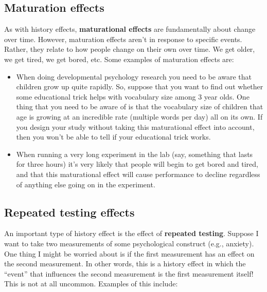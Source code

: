 \documentclass[
  a4paper,
]{book}
\providecommand{\tightlist}{%
  \setlength{\itemsep}{0pt}\setlength{\parskip}{0pt}}
\begin{document}
\subsection{Maturation effects}\label{maturation-effects}

As with history effects, \textbf{maturational effects} are fundamentally
about change over time. However, maturation effects aren't in response
to specific events. Rather, they relate to how people change on their
own over time. We get older, we get tired, we get bored, etc. Some
examples of maturation effects are:

\begin{itemize}
\tightlist
\item
  When doing developmental psychology research you need to be aware that
  children grow up quite rapidly. So, suppose that you want to find out
  whether some educational trick helps with vocabulary size among 3 year
  olds. One thing that you need to be aware of is that the vocabulary
  size of children that age is growing at an incredible rate (multiple
  words per day) all on its own. If you design your study without taking
  this maturational effect into account, then you won't be able to tell
  if your educational trick works.
\item
  When running a very long experiment in the lab (say, something that
  lasts for three hours) it's very likely that people will begin to get
  bored and tired, and that this maturational effect will cause
  performance to decline regardless of anything else going on in the
  experiment.
\end{itemize}

\subsection{Repeated testing effects}\label{repeated-testing-effects}

An important type of history effect is the effect of \textbf{repeated
testing}. Suppose I want to take two measurements of some psychological
construct (e.g., anxiety). One thing I might be worried about is if the
first measurement has an effect on the second measurement. In other
words, this is a history effect in which the ``event'' that influences
the second measurement is the first measurement itself! This is not at
all uncommon. Examples of this include:
\end{document}
